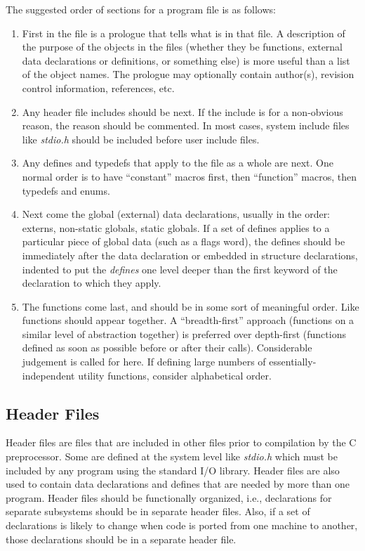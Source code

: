  The suggested order of sections for a program file is as follows: 
\begin{enumerate}
\item First in the file is a prologue that tells what is in that file. A
description of the purpose of the objects in the files (whether they be
functions, external data declarations or definitions, or something else) is
more useful than a list of the object names. The prologue may optionally
contain author(s), revision control information, references, etc. 
\item Any header file includes should be next. If the include is for a
non-obvious reason, the reason should be commented. In most cases, system
include files like {\em stdio.h} should be included before user include files. 
\item Any defines and typedefs that apply to the file as a whole are next. One
normal order is  to have ``constant'' macros first, then ``function'' macros,
then typedefs and enums. 
\item Next come the global (external) data declarations, usually in the order:
externs, non-static globals, static globals. If a set of defines applies to a
particular piece of global data (such as a flags word), the defines should be
immediately after the data declaration or embedded in structure declarations,
indented to put the {\em defines} one level deeper than the first keyword of the
declaration to which they apply.
\item The functions come last, and should be in some sort of meaningful order.
Like functions  should appear together. A ``breadth-first'' approach (functions
on a similar level of  abstraction together) is preferred over depth-first
(functions defined as soon as possible  before or after their calls).
Considerable judgement is called for here. If defining large  numbers of
essentially-independent utility functions, consider alphabetical order. 
\end{enumerate}
\subsection {Header Files}

Header files are files that are included in other files prior to compilation
by the C preprocessor. Some are defined at the system level like {\em stdio.h}
which must be included by any program using the standard I/O library. Header
files are also used to contain data declarations and defines that are needed by
more than one program. Header files should be functionally organized, i.e.,
declarations for separate subsystems should be in separate header files. Also,
if a set of declarations is likely to change when code is ported from one
machine to another, those declarations should be in a separate header file. 

